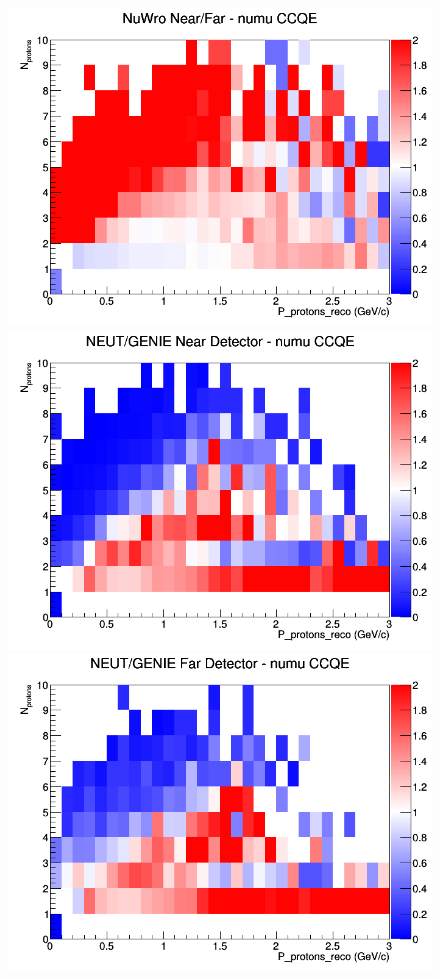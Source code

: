 \begin{figure}[h]
\endminipage
{}
\includegraphics[width=\linewidth]{eff_N_P/GAr/protons/ratios/CCQE_NuWro_numu_NF_N_P.png}
\endminipage
\newline
{}
\includegraphics[width=\linewidth]{eff_N_P/GAr/protons/ratios/CCQE_NEUT_GENIE_numu_near_N_P.png}
\endminipage
{}
\includegraphics[width=\linewidth]{eff_N_P/GAr/protons/ratios/CCQE_NEUT_GENIE_numu_far_N_P.png}

\end{figure}

